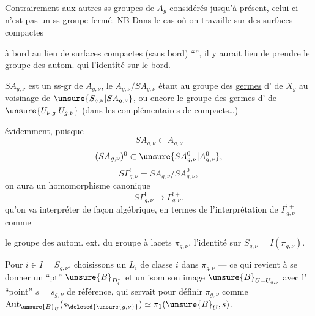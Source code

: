 Contrairement aux autres ss-groupes de $A_g$ considérés jusqu'à présent, celui-ci n'est pas un ss-groupe fermé. \uline{NB} Dans le cas où on travaille sur des surfaces compactes


à bord au lieu de surfaces compactes (sans bord) ``'', il y aurait lieu de prendre le groupe des autom. qui  l'identité sur le bord.

$SA_{g,\nu}$ est un ss-gr  de $A_{g,\nu}$, le  $A_{g,\nu}/SA_{g,\nu}$ étant  au groupe des \uline{germes} d' de $X_g$ au voisinage de $\unsure{S_{g,\nu}|SA_{g,\nu}}$, ou encore le groupe des germes  d' de $\unsure{U_{\nu,g}|U_{g,\nu}}$ (dans les complémentaires de compacts\ldots)

  évidemment, puisque
\[
SA_{g,\nu}\subset A_{g,\nu}
\]
\[
(SA_{g,\nu})^{0}\subset \unsure{SA_{g,\nu}^{0}|A_{g,\nu}^{0}},
\]
\[
S\Gamma_{g,\nu}^{!}=SA_{g,\nu}/SA_{g,\nu}^{0},
\]
on aura un homomorphisme canonique
\[
S\Gamma_{g,\nu}^{!}\longrightarrow\Gamma_{g,\nu}^{!+}.
\]
qu'on va interpréter de façon algébrique, en termes de l'interprétation de $\Gamma_{g,\nu}^{!+}$ \inserted{$=\Gamma^{!}$} comme


le groupe des autom. ext. du groupe à lacets $\pi_{g,\nu}$,  l'identité sur $S_{g,\nu}=I(\pi_{g,\nu})$.

  Pour $i\in I=S_{g,\nu}$, choisissons un \deleted{$\unsure{\ell}$} $L_i$ de classe $i$ dans $\pi_{g,\nu}$ --- ce qui revient à se donner un ``pt''  $\unsure{B}_{D_i^{*}}$   et un isom  son image  $\unsure{B}_{U=U_{g,\nu}}$ avec l' ``point'' $s=s_{g,\nu}$ de référence, qui servait pour définir $\pi_{g,\nu}$ comme $\operatorname{Aut}_{\unsure{B}_U}(s_{\deleted{\unsure{g,\nu}}})\simeq\pi_1(\unsure{B}_U,s)$.

